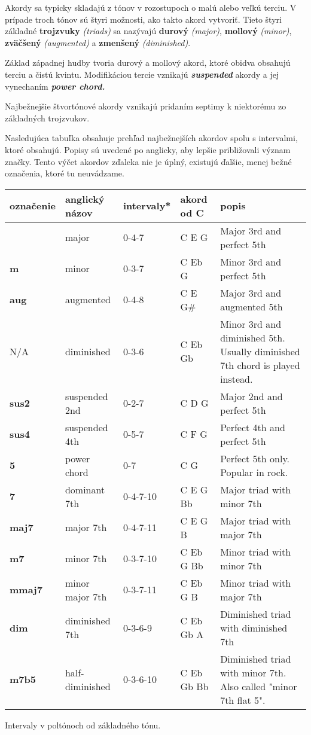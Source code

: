 \begin{center}
 \quad {}
\end{center}

Akordy sa typicky skladajú z tónov v rozostupoch o malú alebo veľkú terciu. V prípade troch tónov sú štyri možnosti,
ako takto akord vytvoriť. Tieto štyri základné \textbf{trojzvuky} \textit{(triads)} sa nazývajú
\textbf{durový} \textit{(major)}, \textbf{mollový} \textit{(minor)}, \textbf{zväčšený} \textit{(augmented)}
a \textbf{zmenšený} \textit{(diminished)}.

Základ západnej hudby tvoria durový a mollový akord, ktoré obidva obsahujú terciu a čistú kvintu. Modifikáciou
tercie vznikajú \textbf{\textit{suspended}} akordy a jej vynechaním \textbf{\textit{power chord.}}

Najbežnejšie štvortónové akordy vznikajú pridaním septimy k niektorému zo základných trojzvukov.

Nasledujúca tabuľka obsahuje prehľad najbežnejších akordov spolu s intervalmi, ktoré obsahujú.
Popisy sú uvedené po anglicky, aby lepšie približovali význam značky. Tento výčet akordov zďaleka
nie je úplný, existujú ďalšie, menej bežné označenia, ktoré tu neuvádzame.

\begin{tabularx}{\linewidth}{ l l l l X }
    označenie & anglický názov & intervaly* & akord od C & popis \\
    \hline
      & major & 0-4-7 & C E G & Major 3rd and perfect 5th \\
    \textbf{m} & minor & 0-3-7 & C Eb G & Minor 3rd and perfect 5th \\
    \textbf{aug} & augmented & 0-4-8 & C E G\# & Major 3rd and augmented 5th \\
    N/A & diminished & 0-3-6 & C Eb Gb & Minor 3rd and diminished 5th. Usually diminished 7th chord is played instead. \\
    \hline
    \textbf{sus2} & suspended 2nd & 0-2-7 & C D G & Major 2nd and perfect 5th  \\
    \textbf{sus4} & suspended 4th & 0-5-7 & C F G & Perfect 4th and perfect 5th \\
    \textbf{5} & power chord & 0-7 & C G & Perfect 5th only. Popular in rock. \\
    \hline
    \textbf{7} & dominant 7th &  0-4-7-10 & C E G Bb & Major triad with minor 7th  \\
    \textbf{maj7} & major 7th &  0-4-7-11 & C E G B & Major triad with major 7th \\
    \textbf{m7} & minor 7th &  0-3-7-10 & C Eb G Bb & Minor triad with minor 7th \\
    \textbf{mmaj7} & minor major 7th &  0-3-7-11 & C Eb G B & Minor triad with major 7th \\
    \textbf{dim} & diminished 7th &  0-3-6-9 & C Eb Gb A & Diminished triad with diminished 7th \\
    \textbf{m7b5} & half-diminished &  0-3-6-10 & C Eb Gb Bb & Diminished triad with minor 7th. Also called "minor 7th flat 5". \\
\end{tabularx}
{\smaller *Intervaly v poltónoch od základného tónu.}

